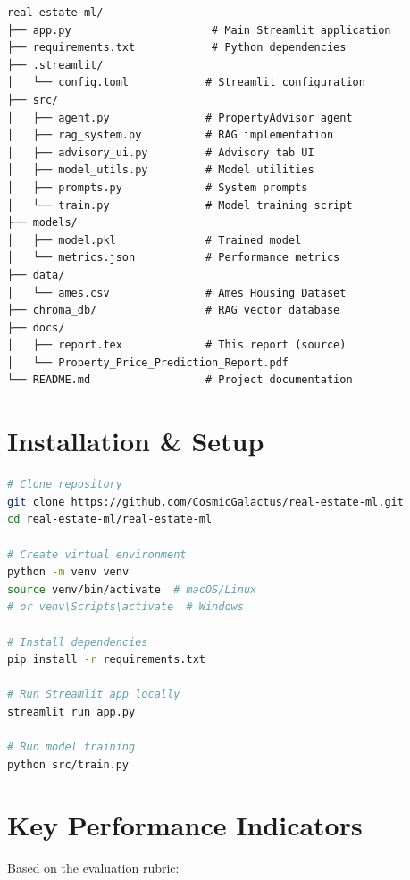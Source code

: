 \documentclass[11pt,a4paper]{article}
\begin{document}
\begin{lstlisting}
real-estate-ml/
├── app.py                      # Main Streamlit application
├── requirements.txt            # Python dependencies
├── .streamlit/
│   └── config.toml            # Streamlit configuration
├── src/
│   ├── agent.py               # PropertyAdvisor agent
│   ├── rag_system.py          # RAG implementation
│   ├── advisory_ui.py         # Advisory tab UI
│   ├── model_utils.py         # Model utilities
│   ├── prompts.py             # System prompts
│   └── train.py               # Model training script
├── models/
│   ├── model.pkl              # Trained model
│   └── metrics.json           # Performance metrics
├── data/
│   └── ames.csv               # Ames Housing Dataset
├── chroma_db/                 # RAG vector database
├── docs/
│   ├── report.tex             # This report (source)
│   └── Property_Price_Prediction_Report.pdf
└── README.md                  # Project documentation
\end{lstlisting}

\section{Installation \& Setup}

\begin{lstlisting}[language=bash]
# Clone repository
git clone https://github.com/CosmicGalactus/real-estate-ml.git
cd real-estate-ml/real-estate-ml

# Create virtual environment
python -m venv venv
source venv/bin/activate  # macOS/Linux
# or venv\Scripts\activate  # Windows

# Install dependencies
pip install -r requirements.txt

# Run Streamlit app locally
streamlit run app.py

# Run model training
python src/train.py
\end{lstlisting}

\section{Key Performance Indicators}

Based on the evaluation rubric:
\end{document}

